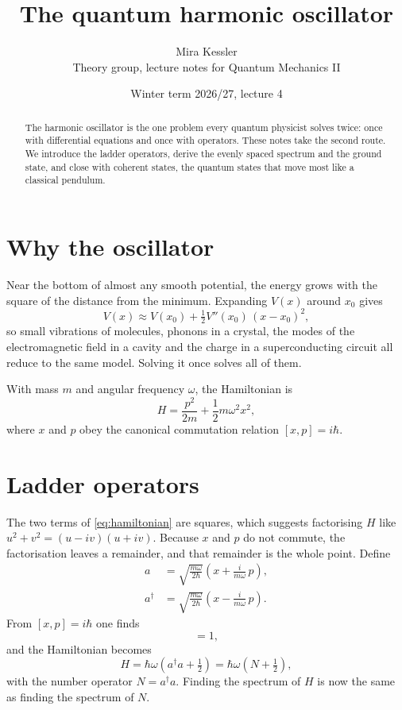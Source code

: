 \documentclass[10pt,twocolumn]{article}
\title{\bfseries The quantum harmonic oscillator}
\author{Mira Kessler\\\small Theory group, lecture notes for Quantum Mechanics II}
\date{Winter term 2026/27, lecture 4}
\newcommand{\ad}{a^\dagger}
\begin{document}
\maketitle

\begin{abstract}
The harmonic oscillator is the one problem every quantum physicist solves
twice: once with differential equations and once with operators. These
notes take the second route. We introduce the ladder operators, derive the
evenly spaced spectrum and the ground state, and close with coherent
states, the quantum states that move most like a classical pendulum.
\end{abstract}

\section{Why the oscillator}

Near the bottom of almost any smooth potential, the energy grows with the
square of the distance from the minimum. Expanding $V(x)$ around $x_0$
gives
\begin{equation}
  V(x) \approx V(x_0) + \tfrac12 V''(x_0)\,(x-x_0)^2 ,
\end{equation}
so small vibrations of molecules, phonons in a crystal, the modes of the
electromagnetic field in a cavity and the charge in a superconducting
circuit all reduce to the same model. Solving it once solves all of them.

With mass $m$ and angular frequency $\omega$, the Hamiltonian is
\begin{equation}
  H = \frac{p^2}{2m} + \frac12 m\omega^2 x^2 ,
  \label{eq:hamiltonian}
\end{equation}
where $x$ and $p$ obey the canonical commutation relation
$[x,p] = i\hbar$.

\section{Ladder operators}

The two terms of \eqref{eq:hamiltonian} are squares, which suggests
factorising $H$ like $u^2+v^2 = (u-iv)(u+iv)$. Because $x$ and $p$ do not
commute, the factorisation leaves a remainder, and that remainder is the
whole point. Define
\begin{align}
  a   &= \sqrt{\frac{m\omega}{2\hbar}}\left(x + \frac{i}{m\omega}\,p\right), \\
  \ad &= \sqrt{\frac{m\omega}{2\hbar}}\left(x - \frac{i}{m\omega}\,p\right).
\end{align}
From $[x,p]=i\hbar$ one finds
\begin{equation}
  [a,\ad] = 1 ,
\end{equation}
and the Hamiltonian becomes
\begin{equation}
  H = \hbar\omega\left(\ad a + \tfrac12\right) = \hbar\omega\left(N + \tfrac12\right),
  \label{eq:number}
\end{equation}
with the number operator $N=\ad a$. Finding the spectrum of $H$ is now the
same as finding the spectrum of $N$.
\end{document}
